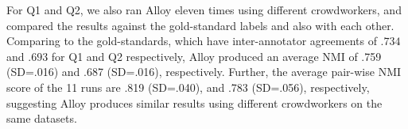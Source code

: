 For Q1 and Q2, we also ran Alloy eleven times using different
crowdworkers, and compared the results against the gold-standard labels and also with
each other. Comparing to the gold-standards, which have inter-annotator
agreements of $.734$ and
$.693$ for Q1 and Q2 respectively, Alloy produced an average NMI of .759 (SD=.016) and .687 (SD=.016), respectively.
Further, the average pair-wise NMI score of the 11 runs are .819 (SD=.040), and .783 (SD=.056), respectively, suggesting Alloy
produces similar results using different crowdworkers on the same datasets.




